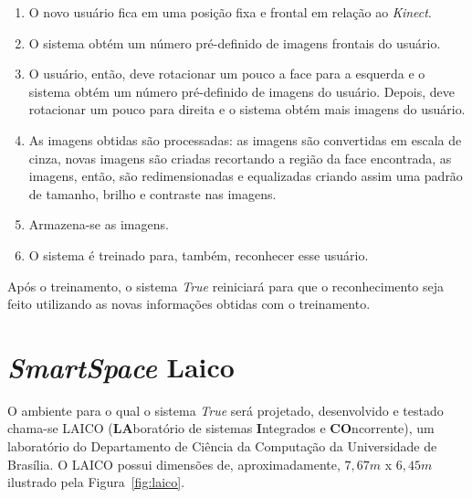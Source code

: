 		\begin{enumerate}
			\item O novo usuário fica em uma posição fixa e frontal em relação ao \textit{Kinect}. 
			\item O sistema obtém um número pré-definido de imagens frontais do usuário.
			\item O usuário, então, deve rotacionar um pouco a face para a esquerda e o sistema obtém um número pré-definido de imagens do usuário. Depois, deve rotacionar um pouco para direita e o sistema obtém mais imagens do usuário.
			\item As imagens obtidas são processadas: as imagens são convertidas em escala de cinza, novas imagens são criadas recortando a região da face encontrada, as imagens, então, são redimensionadas e equalizadas criando assim uma padrão de tamanho, brilho e contraste nas imagens.
			\item Armazena-se as imagens.
			\item O sistema é treinado para, também, reconhecer esse usuário.
		\end{enumerate}

	Após o treinamento, o sistema \textit{True} reiniciará para que o reconhecimento seja feito utilizando as novas informações obtidas com o treinamento.

\section{\textit{SmartSpace} Laico}

	O ambiente para o qual o sistema \textit{True} será projetado, desenvolvido e testado chama-se LAICO (\textbf{LA}boratório de sistemas \textbf{I}ntegrados e \textbf{CO}ncorrente), um laboratório do Departamento de Ciência da Computação da Universidade de Brasília. O LAICO possui dimensões de, aproximadamente,  $\displaystyle 7,67m$ x $\displaystyle 6,45m$ ilustrado pela Figura~\ref{fig:laico}.

